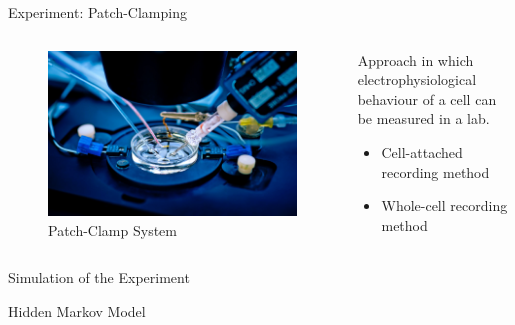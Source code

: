 \documentclass[table, aspectratio=169]{beamer}
\begin{document}
  \begin{frame}{Experiment: Patch-Clamping}
    \begin{columns}
      \begin{column}{0.4\linewidth}
        \begin{figure}
          \includegraphics[width=\linewidth]{../../figures/patch-clamp-system.jpeg}
          \caption{Patch-Clamp System \cite{2025-patch-clamp-image}}
        \end{figure}
      \end{column}
      \begin{column}{0.58\linewidth}
        Approach in which electrophysiological behaviour of a cell can be measured in a lab.
        \begin{itemize}
          \item Cell-attached recording method
          \item Whole-cell recording method
        \end{itemize}
      \end{column}
    \end{columns}
  \end{frame}

  \begin{frame}{Simulation of the Experiment}
  \end{frame}

  \begin{frame}{Hidden Markov Model}

  \end{frame}
\end{document}
